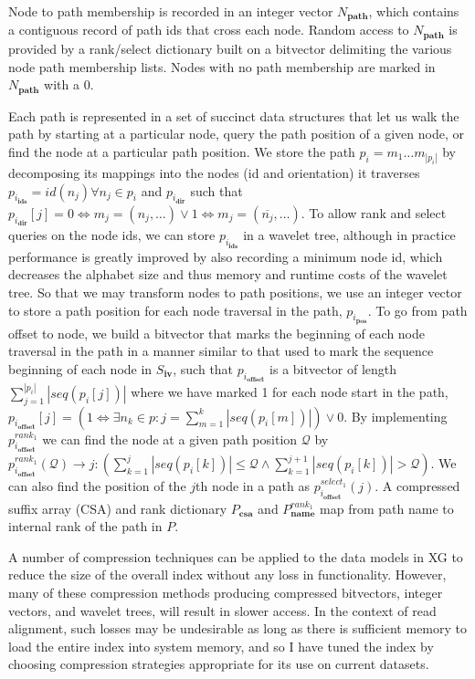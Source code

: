 Node to path membership is recorded in an integer vector $N_\textbf{path}$, which contains a contiguous record of path ids that cross each node.
Random access to $N_\textbf{path}$ is provided by a rank/select dictionary built on a bitvector delimiting the various node path membership lists.
Nodes with no path membership are marked in $N_\textbf{path}$ with a 0.

Each path is represented in a set of succinct data structures that let us walk the path by starting at a particular node, query the path position of a given node, or find the node at a particular path position.
We store the path $p_i = m_1 \ldots m_{|p_i|}$ by decomposing its mappings into the nodes (id and orientation) it traverses $p_{i_\textbf{ids}} = id(n_j) \forall n_j \in p_i$ and $p_{i_\textbf{dir}}$ such that $p_{i_\textbf{dir}}[j] = 0 \iff m_j = (n_j, \ldots) \lor 1 \iff m_j = (\overline{n_j}, \ldots)$.
To allow rank and select queries on the node ids, we can store $p_{i_\textbf{ids}}$ in a wavelet tree, although in practice performance is greatly improved by also recording a minimum node id, which decreases the alphabet size and thus memory and runtime costs of the wavelet tree.
So that we may transform nodes to path positions, we use an integer vector to store a path position for each node traversal in the path, $p_{i_\textbf{pos}}$.
To go from path offset to node, we build a bitvector that marks the beginning of each node traversal in the path in a manner similar to that used to mark the sequence beginning of each node in $S_\textbf{iv}$, such that $p_{i_\textbf{offset}}$ is a bitvector of length $\sum_{j=1}^{|p_i|} |seq(p_i[j])|$ where we have marked 1 for each node start in the path, $p_{i_\textbf{offset}}[j] = \left( 1 \iff \exists n_k \in p : j = \sum_{m=1}^{k} |seq(p_i[m])| \right) \lor 0$.
By implementing $p_{i_\textbf{offset}}^{rank_1}$ we can find the node at a given path position $\mathcal{Q}$ by $p_{i_\textbf{offset}}^{rank_1}(\mathcal{Q}) \to j : \left( \sum_{k=1}^{j} |seq(p_i[k])| \leq \mathcal{Q} \land \sum_{k=1}^{j+1} |seq(p_i[k])| > \mathcal{Q} \right)$.
We can also find the position of the $j$th node in a path as $p_{i_\textbf{offset}}^{select_1}(j)$.
A compressed suffix array (CSA) and rank dictionary $P_\textbf{csa}$ and $P_\textbf{name}^{rank_1}$ map from path name to internal rank of the path in $P$.

A number of compression techniques can be applied to the data models in XG to reduce the size of the overall index without any loss in functionality.
However, many of these compression methods producing compressed bitvectors, integer vectors, and wavelet trees, will result in slower access.
In the context of read alignment, such losses may be undesirable as long as there is sufficient memory to load the entire index into system memory, and so I have tuned the index by choosing compression strategies appropriate for its use on current datasets.

